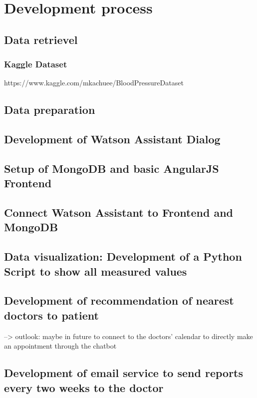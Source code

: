 \chapter{Development process}\label{dev_process}

\section{Data retrievel}

\subsection{Kaggle Dataset}
https://www.kaggle.com/mkachuee/BloodPressureDataset

\section{Data preparation}

\section{Development of Watson Assistant Dialog}

\section{Setup of MongoDB and basic AngularJS Frontend}

\section{Connect Watson Assistant to Frontend and MongoDB}

\section{Data visualization: Development of a Python Script to show all measured values}

\section{Development of recommendation of nearest doctors to patient}
--> outlook: maybe in future to connect to the doctors' calendar to directly make an appointment through the chatbot

\section{Development of email service to send reports every two weeks to the doctor}


